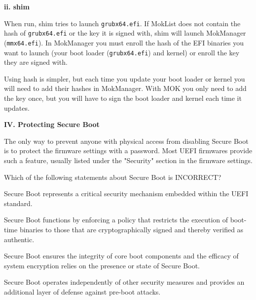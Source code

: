 \documentclass{exam-zh}
\begin{document}
\textbf{ii. shim}

When run, shim tries to launch \texttt{grubx64.efi}. If MokList does not contain the hash of \texttt{grubx64.efi} or the key it is signed with, shim will launch MokManager (\texttt{mmx64.efi}). In MokManager you must enroll the hash of the EFI binaries you want to launch (your boot loader (\texttt{grubx64.efi}) and kernel) or enroll the key they are signed with.

Using hash is simpler, but each time you update your boot loader or kernel you will need to add their hashes in MokManager. With MOK you only need to add the key once, but you will have to sign the boot loader and kernel each time it updates.

\par
\endgroup

\textbf{IV. Protecting Secure Boot}

The only way to prevent anyone with physical access from disabling Secure Boot is to protect the firmware settings with a password. Most UEFI firmwares provide such a feature, usually listed under the "Security" section in the firmware settings.

\begin{question}
Which of the following statements about Secure Boot is INCORRECT?
\begin{choices}
\item Secure Boot represents a critical security mechanism embedded within the UEFI standard.

\item Secure Boot functions by enforcing a policy that restricts the execution of boot-time binaries to those that are cryptographically signed and thereby verified as authentic.

\item Secure Boot ensures the integrity of core boot components and the efficacy of system encryption relies on the presence or state of Secure Boot.

\item Secure Boot operates independently of other security measures and provides an additional layer of defense against pre-boot attacks.
\end{choices}
\end{question}
\end{document}
